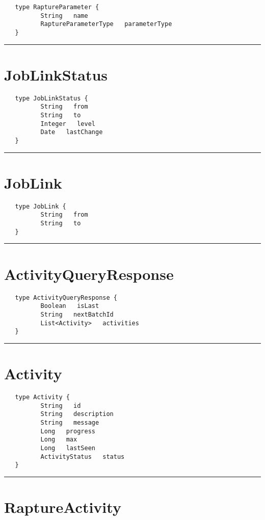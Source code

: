 \begin{verbatim}
   type RaptureParameter {
          String   name
          RaptureParameterType   parameterType
   }
\end{verbatim}

\rule{15cm}{2pt}
\section{JobLinkStatus}
\label{type:JobLinkStatus}

\begin{verbatim}
   type JobLinkStatus {
          String   from
          String   to
          Integer   level
          Date   lastChange
   }
\end{verbatim}

\rule{15cm}{2pt}
\section{JobLink}
\label{type:JobLink}

\begin{verbatim}
   type JobLink {
          String   from
          String   to
   }
\end{verbatim}

\rule{15cm}{2pt}
\section{ActivityQueryResponse}
\label{type:ActivityQueryResponse}

\begin{verbatim}
   type ActivityQueryResponse {
          Boolean   isLast
          String   nextBatchId
          List<Activity>   activities
   }
\end{verbatim}

\rule{15cm}{2pt}
\section{Activity}
\label{type:Activity}

\begin{verbatim}
   type Activity {
          String   id
          String   description
          String   message
          Long   progress
          Long   max
          Long   lastSeen
          ActivityStatus   status
   }
\end{verbatim}

\rule{15cm}{2pt}
\section{RaptureActivity}
\label{type:RaptureActivity}

